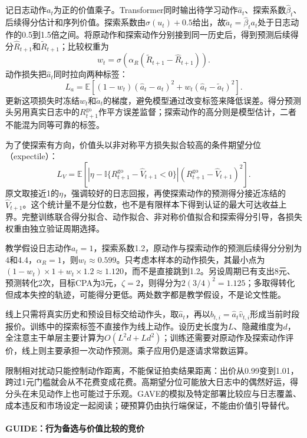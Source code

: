 记日志动作$a_t$为正的价值乘子。Transformer同时输出待学习动作$\widehat a_t$、探索系数$\widehat\beta_t$、后续得分估计和序列价值。探索系数由$\sigma(u_t)+0.5$给出，故$\widetilde a_t=\widehat\beta_ta_t$处于日志动作的0.5到1.5倍之间。将原动作和探索动作分别接到同一历史后，得到预测后续得分$\widehat R_{t+1}$和$\widetilde R_{t+1}$；比较权重为
\[
  w_t=\sigma\!\left(\alpha_R
       (\widetilde R_{t+1}-\widehat R_{t+1})\right).
\]
动作损失把$\widehat a_t$同时拉向两种标签：
\[
  L_a=\mathbb{E}\left[
      (1-w_t)(\widehat a_t-a_t)^2+
      w_t(\widehat a_t-\widetilde a_t)^2\right].
\]
更新这项损失时冻结$w_t$和$\widetilde a_t$的梯度，避免模型通过改变标签来降低误差。得分预测头另用真实日志中的$R_{t+1}^{\mathrm{go}}$作平方误差监督；探索动作的高分则是模型估计，二者不能混为同等可靠的标签。

为了使探索有方向，价值头以非对称平方损失拟合较高的条件期望分位（expectile）：
\[
  L_V=\mathbb{E}\!\left[
    \left|\eta-\mathbb{I}\{R_{t+1}^{\mathrm{go}}-\widehat V_{t+1}<0\}\right|
    (R_{t+1}^{\mathrm{go}}-\widehat V_{t+1})^2\right].
\]
原文取接近1的$\eta$，强调较好的日志回报，再使探索动作的预测得分接近冻结的$\widehat V_{t+1}$。这个统计量不是分位数，也不是有限样本下得到认证的最大可达收益上界。完整训练联合得分拟合、动作拟合、非对称价值拟合和探索得分引导，各损失权重由独立验证周期选择。

教学假设日志动作$a_t=1$，探索系数1.2，原动作与探索动作的预测后续得分分别为4和4.4，$\alpha_R=1$，则$w_t\approx0.599$。只考虑本样本的动作损失，其最小点为$(1-w_t)\times1+w_t\times1.2\approx1.120$，而不是直接跳到1.2。另设周期已有支出8元、预测转化2次，目标CPA为3元，$\zeta=2$，则得分为$2(3/4)^2=1.125$；多取得转化但成本失控的轨迹，可能得分更低。两处数字都是教学假设，不是论文性能。

线上只需将真实历史和预设目标交给动作头，取$\widehat a_t$，再以$b_{t,i}=\widehat a_t\widehat v_{t,i}$形成当前时段报价。训练中的探索标签不直接作为线上动作。设历史长度为$L$、隐藏维度为$d$，全注意主干单层主要计算为$O(L^2d+Ld^2)$；训练还需要对原动作及探索动作评价，线上则主要承担一次动作预测。乘子应用仍是逐请求常数运算。

限制相对扰动只能控制动作距离，不能保证拍卖结果距离：出价从0.99变到1.01，跨过1元门槛就会从不花费变成花费。高期望分位可能放大日志中的偶然好运，得分头在未见动作上也可能过于乐观。GAVE的模拟及特定部署比较应与日志覆盖、成本违反和市场设定一起阅读；硬预算仍由执行端保证，不能由价值引导替代。

\paragraph{GUIDE：行为备选与价值比较的竞价}
\label{sec:rs-advertising-guide}

